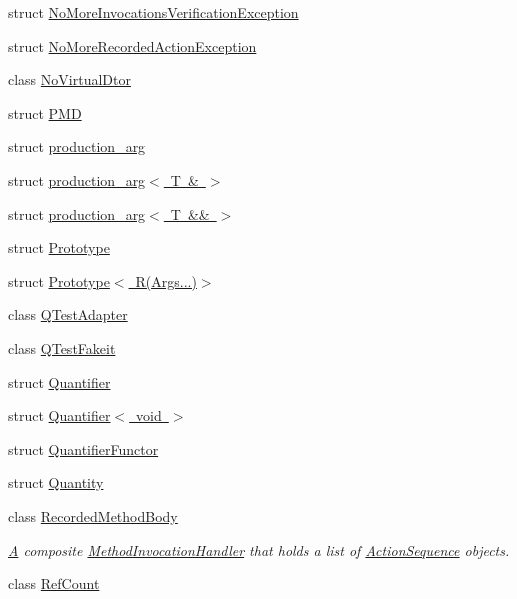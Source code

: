\begin{DoxyCompactItemize}
struct \mbox{\hyperlink{structfakeit_1_1NoMoreInvocationsVerificationException}{No\+More\+Invocations\+Verification\+Exception}}
\item 
struct \mbox{\hyperlink{structfakeit_1_1NoMoreRecordedActionException}{No\+More\+Recorded\+Action\+Exception}}
\item 
class \mbox{\hyperlink{classfakeit_1_1NoVirtualDtor}{No\+Virtual\+Dtor}}
\item 
struct \mbox{\hyperlink{structfakeit_1_1PMD}{P\+MD}}
\item 
struct \mbox{\hyperlink{structfakeit_1_1production__arg}{production\+\_\+arg}}
\item 
struct \mbox{\hyperlink{structfakeit_1_1production__arg_3_01T_01_6_01_4}{production\+\_\+arg$<$ T \& $>$}}
\item 
struct \mbox{\hyperlink{structfakeit_1_1production__arg_3_01T_01_6_6_01_4}{production\+\_\+arg$<$ T \&\& $>$}}
\item 
struct \mbox{\hyperlink{structfakeit_1_1Prototype}{Prototype}}
\item 
struct \mbox{\hyperlink{structfakeit_1_1Prototype_3_01R_07Args_8_8_8_08_4}{Prototype$<$ R(\+Args...)$>$}}
\item 
class \mbox{\hyperlink{classfakeit_1_1QTestAdapter}{Q\+Test\+Adapter}}
\item 
class \mbox{\hyperlink{classfakeit_1_1QTestFakeit}{Q\+Test\+Fakeit}}
\item 
struct \mbox{\hyperlink{structfakeit_1_1Quantifier}{Quantifier}}
\item 
struct \mbox{\hyperlink{structfakeit_1_1Quantifier_3_01void_01_4}{Quantifier$<$ void $>$}}
\item 
struct \mbox{\hyperlink{structfakeit_1_1QuantifierFunctor}{Quantifier\+Functor}}
\item 
struct \mbox{\hyperlink{structfakeit_1_1Quantity}{Quantity}}
\item 
class \mbox{\hyperlink{classfakeit_1_1RecordedMethodBody}{Recorded\+Method\+Body}}
\begin{DoxyCompactList}\small\item\em \mbox{\hyperlink{structA}{A}} composite \mbox{\hyperlink{structfakeit_1_1MethodInvocationHandler}{Method\+Invocation\+Handler}} that holds a list of \mbox{\hyperlink{structfakeit_1_1ActionSequence}{Action\+Sequence}} objects. \end{DoxyCompactList}\item 
class \mbox{\hyperlink{classfakeit_1_1RefCount}{Ref\+Count}}
\item 

\end{DoxyCompactItemize}

